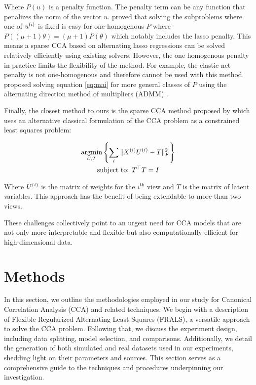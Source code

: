 Where \(P(u)\) is a penalty function.
The penalty term can be any function that penalizes the norm of the vector \(u\).
\cite{mai2019iterative} proved that solving the subproblems where one of $u^{(i)}$ is fixed is easy for one-homogenous $P$ where
\( P((\mu + 1)\theta) = (\mu + 1)P(\theta) \) which notably includes the lasso penalty.
This means a sparse CCA based
on alternating lasso regressions can be solved relatively efficiently using existing solvers.
However, the one homogenous penalty in practice limits the flexibility of the method.
For example, the elastic net penalty is not one-homogenous and therefore cannot be used with this method.\cite{
    kanatsoulis2018structured} proposed solving equation \ref{eq:mai} for more general classes of $P$ using the
alternating direction method of multipliers (ADMM) \cite{boyd2011distributed}.

Finally, the closest method to ours is the sparse CCA method proposed by \cite{fu2017scalable} which uses an
alternative classical formulation of the CCA problem as a constrained least squares problem\cite{
    carroll1968generalization,
    kettenring1971canonical}:

\begin{gather*}
    \underset{U, T}{\mathrm{argmin}}\left\{\sum_i \|X^{(i)} U^{(i)} - T\|_F^2 \right\}\\
    \text{subject to: }T^\top T = I\\
\end{gather*}

Where \(U^{(i)}\) is the matrix of weights for the $i^{\text{th}}$ view and \(T\) is the matrix of latent variables. This
approach has the benefit of being extendable to more than two views.

These challenges collectively point to an urgent need for CCA models that are not only more interpretable and flexible but also computationally efficient for high-dimensional data.

\section{Methods}

In this section, we outline the methodologies employed in our study for Canonical Correlation Analysis (CCA) and related techniques. We begin with a description of Flexible Regularized Alternating Least Squares (FRALS), a versatile approach to solve the CCA problem. Following that, we discuss the experiment design, including data splitting, model selection, and comparisons. Additionally, we detail the generation of both simulated and real datasets used in our experiments, shedding light on their parameters and sources. This section serves as a comprehensive guide to the techniques and procedures underpinning our investigation.

